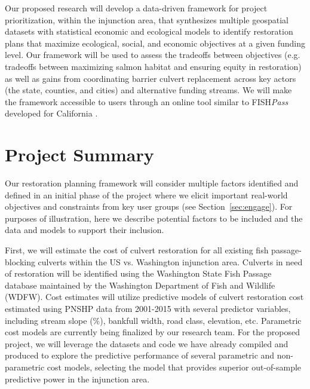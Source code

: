 \documentclass[12pt]{elsarticle}
\begin{document}
Our proposed research will develop a data-driven framework for project prioritization, within the injunction area, that synthesizes multiple geospatial datasets with statistical economic and ecological models to identify restoration plans that maximize ecological, social, and economic objectives at a given funding level. Our framework will be used to assess the tradeoffs between objectives (e.g. tradeoffs between maximizing salmon habitat and ensuring equity in restoration) as well as gains from coordinating barrier culvert replacement across key actors (the state, counties, and cities) and alternative funding streams. We will make the framework accessible to users through an online tool similar to FISH\emph{Pass} developed for California \citep{optipass2015migratory}.

\section{Project Summary}\label{sec:summary} %

Our restoration planning framework will consider multiple factors identified and defined in an initial phase of the project where we elicit important real-world objectives and constraints from key user groups (see Section~\ref{sec:engage}). For purposes of illustration, here we describe potential factors to be included and the data and models to support their inclusion.   

First, we will estimate the cost of culvert restoration for all existing fish passage-blocking culverts within the US vs. Washington injunction area. Culverts in need of restoration will be identified using the Washington State Fish Passage database maintained by the Washington Department of Fish and Wildlife (WDFW). Cost estimates will utilize predictive models of culvert restoration cost estimated using PNSHP data from 2001-2015 with several predictor variables, including stream slope (\%), bankfull width, road class, elevation, etc. Parametric cost models are currently being finalized by our research team. For the proposed project, we will leverage the datasets and code we have already compiled and produced to explore the predictive performance of several parametric and non-parametric cost models, selecting the model that provides superior out-of-sample predictive power in the injunction area.
\end{document}
